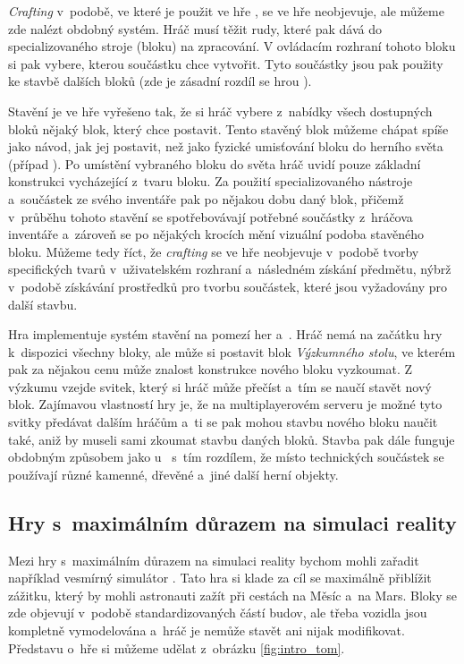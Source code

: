 \textit{Crafting} v~podobě, ve které je použit ve hře \MC{}, se ve hře \SE{} neobjevuje, ale můžeme zde nalézt obdobný systém. Hráč musí těžit rudy, které pak dává do specializovaného stroje (bloku) na zpracování. V ovládacím rozhraní tohoto bloku si pak vybere, kterou součástku chce vytvořit. Tyto součástky jsou pak použity ke stavbě dalších bloků (zde je zásadní rozdíl se hrou \MC{}).

Stavění je ve hře \SE{} vyřešeno tak, že si hráč vybere z~nabídky všech dostupných bloků nějaký blok, který chce postavit. Tento stavěný blok můžeme chápat spíše jako návod, jak jej postavit, než jako fyzické umisťování bloku do herního světa (případ ). Po umístění vybraného bloku do světa hráč uvidí pouze základní konstrukci vycházející z~tvaru bloku. Za použití specializovaného nástroje a~součástek ze svého inventáře pak po nějakou dobu  daný blok, přičemž v~průběhu tohoto stavění se spotřebovávají potřebné součástky z~hráčova inventáře a~zároveň se po nějakých krocích mění vizuální podoba stavěného bloku. Můžeme tedy říct, že \textit{crafting} se ve hře \SE{} neobjevuje v~podobě tvorby specifických tvarů v~uživatelském rozhraní a~následném získání předmětu, nýbrž v~podobě získávání prostředků pro tvorbu součástek, které jsou vyžadovány pro další stavbu.

Hra \ME{} implementuje systém stavění na pomezí her \MC{} a~\SE{}. Hráč nemá na začátku hry k~dispozici všechny bloky, ale může si postavit blok \textit{Výzkumného stolu}, ve kterém pak za nějakou cenu může znalost konstrukce nového bloku vyzkoumat. Z výzkumu vzejde svitek, který si hráč může přečíst a~tím se naučí stavět nový blok. Zajímavou vlastností hry je, že na multiplayerovém serveru je možné tyto svitky předávat dalším hráčům a~ti se pak mohou stavbu nového bloku naučit také, aniž by museli sami zkoumat stavbu daných bloků. Stavba pak dále funguje obdobným způsobem jako u~\SE{} s~tím rozdílem, že místo technických součástek se používají různé kamenné, dřevěné a~jiné další herní objekty. 




\subsection{Hry s~maximálním důrazem na simulaci reality}

Mezi hry s~maximálním důrazem na simulaci reality bychom mohli zařadit například vesmírný simulátor \TM{}. Tato hra si klade za cíl se maximálně přiblížit zážitku, který by mohli astronauti zažít při cestách na Měsíc a~na Mars. Bloky se zde objevují v~podobě standardizovaných částí budov, ale třeba vozidla jsou kompletně vymodelována a~hráč je nemůže stavět ani nijak modifikovat. Představu o~hře si můžeme udělat z~obrázku \ref{fig:intro_tom}.

